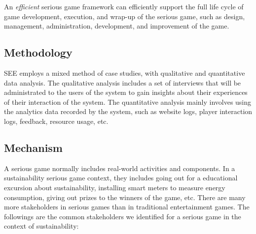 \documentclass{sigchi}
\begin{document}
An \emph{efficient} serious game framework can efficiently support the
full life cycle of game development, execution, and wrap-up of the
serious game, such as design, management, administration, development,
and improvement of the game.

\subsection{Methodology}

SEE employs a mixed method of case studies, with qualitative and
quantitative data analysis. The qualitative analysis includes a set of
interviews that will be administrated to the users of the system to
gain insights about their experiences of their interaction of the
system. The quantitative analysis mainly involves using the analytics
data recorded by the system, such as website logs, player interaction
logs, feedback, resource usage, etc.

\subsection{Mechanism}

A serious game normally includes real-world activities and
components. In a sustainability serious game context, they includes
going out for a educational excursion about sustainability, installing
smart meters to measure energy consumption, giving out prizes to the
winners of the game, etc. There are many more stakeholders in serious
games than in traditional entertainment games. The followings are the
common stakeholders we identified for a serious game in the context of
sustainability:
\end{document}
